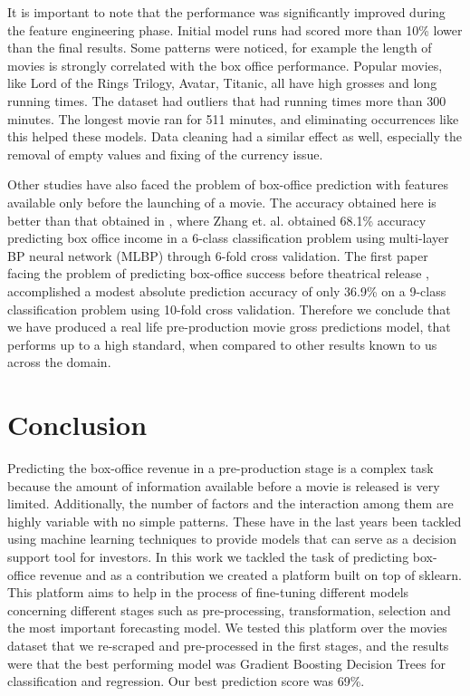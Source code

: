 It is important to note that the performance was significantly improved during the feature engineering phase. Initial model runs had scored more than 10\% lower than the final results. Some patterns were noticed, for example the length of movies is strongly correlated with the box office performance. Popular movies, like Lord of the Rings Trilogy, Avatar, Titanic, all have high grosses and long running times. The dataset had outliers that had running times more than 300 minutes. The longest movie ran for 511 minutes,  and eliminating occurrences like this helped these models. Data cleaning had a similar effect as well, especially the removal of empty values and fixing of the currency issue.

Other studies have also faced the problem of box-office prediction with features available only before the launching of a movie. The accuracy obtained here is better than that obtained in \cite{zhang2009forecasting}, where Zhang et. al. obtained 68.1\% accuracy predicting box office income in a 6-class classification problem using multi-layer BP neural network (MLBP) through 6-fold cross validation. The first paper facing the problem of predicting box-office success before theatrical release \cite{sharda2006predicting}, accomplished a modest absolute prediction accuracy of only 36.9\% on a 9-class classification problem using 10-fold cross validation. Therefore we conclude that we have produced a real life pre-production movie gross predictions model, that performs up to a high standard, when compared to other results known to us across the domain.

\section{Conclusion}
Predicting the box-office revenue in a pre-production stage is a complex task because the amount of information available before a movie is released is very limited. Additionally, the number of factors and the interaction among them are highly variable with no simple patterns. These have in the last years been tackled using machine learning techniques to provide models that can serve as a decision support tool for investors. In this work we tackled the task of predicting box-office revenue and as a contribution we created a platform built on top of sklearn. This platform aims to help in the process of fine-tuning different models concerning different stages such as pre-processing, transformation, selection and the most important forecasting model. We tested this platform over the movies dataset that we re-scraped and pre-processed in the first stages, and the results were that the best performing model was Gradient Boosting Decision Trees for classification and regression. Our best prediction score was 69\%. 
